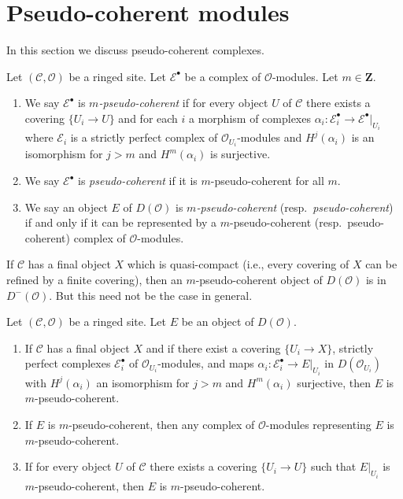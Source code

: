 \section{Pseudo-coherent modules}
\label{section-pseudo-coherent}

\noindent
In this section we discuss pseudo-coherent complexes.

\begin{definition}
\label{definition-pseudo-coherent}
Let $(\mathcal{C}, \mathcal{O})$ be a ringed site. Let $\mathcal{E}^\bullet$
be a complex of $\mathcal{O}$-modules. Let $m \in \mathbf{Z}$.
\begin{enumerate}
\item We say $\mathcal{E}^\bullet$ is {\it $m$-pseudo-coherent}
if for every object $U$ of $\mathcal{C}$ there exists a covering
$\{U_i \to U\}$ and for each $i$ a morphism of complexes
$\alpha_i : \mathcal{E}_i^\bullet \to \mathcal{E}^\bullet|_{U_i}$
where $\mathcal{E}_i$ is a strictly perfect complex of
$\mathcal{O}_{U_i}$-modules and $H^j(\alpha_i)$ is an isomorphism
for $j > m$ and $H^m(\alpha_i)$ is surjective.
\item We say $\mathcal{E}^\bullet$ is {\it pseudo-coherent}
if it is $m$-pseudo-coherent for all $m$.
\item We say an object $E$ of $D(\mathcal{O})$ is
{\it $m$-pseudo-coherent} (resp.\ {\it pseudo-coherent})
if and only if it can be represented by a $m$-pseudo-coherent
(resp.\ pseudo-coherent) complex of $\mathcal{O}$-modules.
\end{enumerate}
\end{definition}

\noindent
If $\mathcal{C}$ has a final object $X$ which is quasi-compact
(i.e., every covering of $X$ can be refined by a finite covering),
then an $m$-pseudo-coherent object of $D(\mathcal{O})$ is in
$D^-(\mathcal{O})$. But this need not be the case in general.

\begin{lemma}
\label{lemma-pseudo-coherent-independent-representative}
Let $(\mathcal{C}, \mathcal{O})$ be a ringed site.
Let $E$ be an object of $D(\mathcal{O})$.
\begin{enumerate}
\item If $\mathcal{C}$ has a final object $X$ and if there exist a covering
$\{U_i \to X\}$, strictly perfect complexes $\mathcal{E}_i^\bullet$ of
$\mathcal{O}_{U_i}$-modules, and
maps $\alpha_i : \mathcal{E}_i^\bullet \to E|_{U_i}$ in
$D(\mathcal{O}_{U_i})$ with $H^j(\alpha_i)$ an isomorphism for $j > m$
and $H^m(\alpha_i)$ surjective, then $E$ is $m$-pseudo-coherent.
\item If $E$ is $m$-pseudo-coherent, then any complex of $\mathcal{O}$-modules
representing $E$ is $m$-pseudo-coherent.
\item If for every object $U$ of $\mathcal{C}$ there exists a covering
$\{U_i \to U\}$ such that $E|_{U_i}$ is $m$-pseudo-coherent, then
$E$ is $m$-pseudo-coherent.
\end{enumerate}
\end{lemma}

